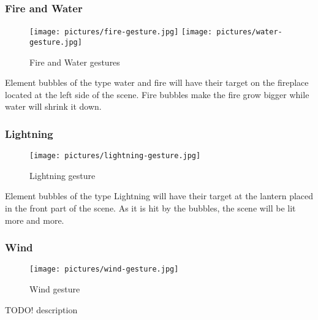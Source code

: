 \subsubsection{Fire and Water}
\begin{figure}[!ht]
\texttt{[image: pictures/fire-gesture.jpg]}
\texttt{[image: pictures/water-gesture.jpg]}
\caption{Fire and Water gestures}
\end{figure}

Element bubbles of the type water and fire will have their target on the fireplace located at the left side of the scene. Fire bubbles make the fire grow bigger while water will shrink it down.

\subsubsection{Lightning}
\begin{figure}[!ht]
\texttt{[image: pictures/lightning-gesture.jpg]}
\caption{Lightning gesture}
\end{figure}

Element bubbles of the type Lightning will have their target at the lantern placed in the front part of the scene. As it is hit by the bubbles, the scene will be lit more and more.

\subsubsection{Wind}
\begin{figure}[!ht]
\texttt{[image: pictures/wind-gesture.jpg]}
\caption{Wind gesture}
\end{figure}
TODO! description\\
